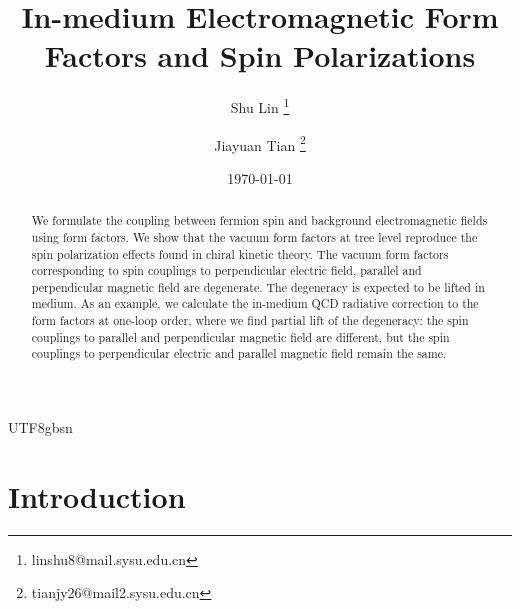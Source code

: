 \documentclass[11pt]{article}\def\baselinestretch{1.4}
\date{\today}
\begin{document}
\begin{CJK}{UTF8}{gbsn}

\title{\bf In-medium Electromagnetic Form Factors and Spin Polarizations}

\author[1]{{Shu Lin}
\thanks{linshu8@mail.sysu.edu.cn}}
\author[1]{{Jiayuan Tian}
\thanks{tianjy26@mail2.sysu.edu.cn}}

\maketitle


\begin{abstract}
We formulate the coupling between fermion spin and background electromagnetic fields using form factors. We show that the vacuum form factors at tree level reproduce the spin polarization effects found in chiral kinetic theory. The vacuum form factors corresponding to spin couplings to perpendicular electric field, parallel and perpendicular magnetic field are degenerate. The degeneracy is expected to be lifted in medium. As an example, we calculate the in-medium QCD radiative correction to the form factors at one-loop order, where we find partial lift of the degeneracy: the spin couplings to parallel and perpendicular magnetic field are different, but the spin couplings to perpendicular electric and parallel magnetic field remain the same. 
\end{abstract}


\newpage

\section{Introduction}


\end{CJK}
\end{document}
